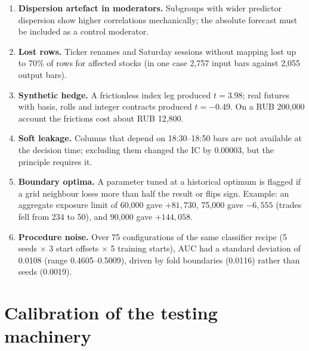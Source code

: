 \begin{enumerate}
\item \textbf{Dispersion artefact in moderators.} Subgroups with wider predictor dispersion show higher correlations mechanically; the absolute forecast must be included as a control moderator.
\item \textbf{Lost rows.} Ticker renames and Saturday sessions without mapping lost up to 70\% of rows for affected stocks (in one case 2,757 input bars against 2,055 output bars).
\item \textbf{Synthetic hedge.} A frictionless index leg produced $t=3.98$; real futures with basis, rolls and integer contracts produced $t=-0.49$. On a RUB 200,000 account the frictions cost about RUB 12,800.
\item \textbf{Soft leakage.} Columns that depend on 18:30--18:50 bars are not available at the decision time; excluding them changed the IC by 0.00003, but the principle requires it.
\item \textbf{Boundary optima.} A parameter tuned at a historical optimum is flagged if a grid neighbour loses more than half the result or flips sign. Example: an aggregate exposure limit of 60,000 gave $+81{,}730$, 75,000 gave $-6{,}555$ (trades fell from 234 to 50), and 90,000 gave $+144{,}058$.
\item \textbf{Procedure noise.} Over 75 configurations of the same classifier recipe (5 seeds $\times$ 3 start offsets $\times$ 5 training starts), AUC had a standard deviation of 0.0108 (range 0.4605--0.5009), driven by fold boundaries (0.0116) rather than seeds (0.0019).
\end{enumerate}

\section{Calibration of the testing machinery}\label{app:calibration}

